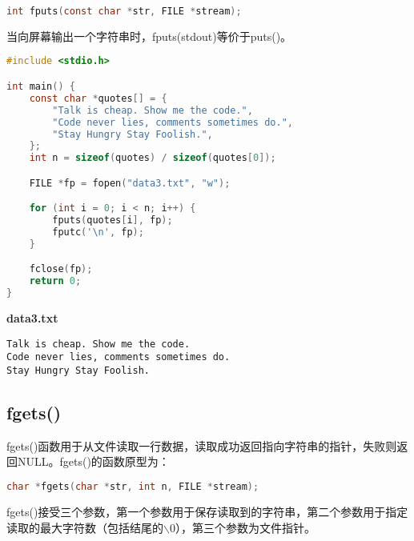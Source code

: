 \vspace{-0.5cm}

\begin{lstlisting}[language=C]
int fputs(const char *str, FILE *stream);
\end{lstlisting}

当向屏幕输出一个字符串时，fputs(stdout)等价于puts()。\\


\begin{lstlisting}[language=C]
#include <stdio.h>

int main() {
    const char *quotes[] = {
        "Talk is cheap. Show me the code.",
        "Code never lies, comments sometimes do.",
        "Stay Hungry Stay Foolish.",
    };
    int n = sizeof(quotes) / sizeof(quotes[0]);

    FILE *fp = fopen("data3.txt", "w");

    for (int i = 0; i < n; i++) {
        fputs(quotes[i], fp);
        fputc('\n', fp);
    }

    fclose(fp);
    return 0;
}
\end{lstlisting}

\begin{tcolorbox}
    \textbf{data3.txt}
    \begin{verbatim}
Talk is cheap. Show me the code.
Code never lies, comments sometimes do.
Stay Hungry Stay Foolish.
	\end{verbatim}
\end{tcolorbox}

\vspace{0.5cm}

\subsection{fgets()}

fgets()函数用于从文件读取一行数据，读取成功返回指向字符串的指针，失败则返回NULL。fgets()的函数原型为：

\vspace{-0.5cm}

\begin{lstlisting}[language=C]
char *fgets(char *str, int n, FILE *stream);
\end{lstlisting}

fgets()接受三个参数，第一个参数用于保存读取到的字符串，第二个参数用于指定读取的最大字符数（包括结尾的$ \backslash $0），第三个参数为文件指针。\\

